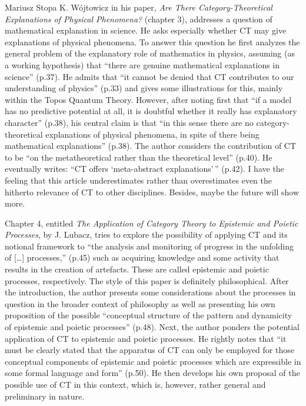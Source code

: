\begin{recengenv}{Mariusz Stopa}
K. Wójtowicz in his paper, \textit{Are There Category-Theoretical Explanations of Physical Phenomena?} (chapter 3), addresses a question of mathematical explanation in science. He asks especially whether CT may give explanations of physical phenomena. To answer this question he first analyzes the general problem of the explanatory role of mathematics in physics, assuming (as a working hypothesis) that ``there are genuine mathematical explanations in science'' (p.37). He admits that ``it cannot be denied that CT contributes to our understanding of physics'' (p.33) and gives some illustrations for this, mainly within the Topos Quantum Theory. However, after noting first that ``if a model has no predictive potential at all, it is doubtful whether it really has explanatory character'' (p.38), his central claim is that ``in this sense there are no cat\-e\-go\-ry-theoretical explanations of physical phenomena, in spite of there being mathematical explanations'' (p.38). The author considers the contribution of CT to be ``on the metatheoretical rather than the theoretical level'' (p.40). He eventually writes: ``CT offers `meta-abstract explanations'$\,\!$'' (p.42). I have the feeling that this article underestimates rather than overestimates even the hitherto relevance of CT to other disciplines. Besides, maybe the future will show more.


Chapter 4, entitled \textit{The Application of Category Theory to Epistemic and Poietic Processes}, by J. Lubacz, tries to explore the possibility of applying CT and its notional framework to ``the analysis and monitoring of progress in the unfolding of [\ldots] processes,'' (p.45) such as acquiring knowledge and some activity that results
in the creation of artefacts. These are called epistemic and poietic processes, respectively. The style of this paper is definitely philosophical. After the introduction, the author presents some considerations about the processes in question in the broader context of philosophy as well as presenting his own proposition of the possible ``conceptual structure of the pattern and dynamicity of epistemic and poietic processes'' (p.48). Next, the author ponders the potential application of CT to epistemic and poietic processes. He rightly notes that ``it must be clearly stated that the apparatus of CT can only be employed for those conceptual components of epistemic and poietic processes which are expressible in some formal language and form'' (p.50). He then develops his own proposal of the possible use of CT in this context, which is, however, rather general and preliminary in nature.


\end{recengenv}
